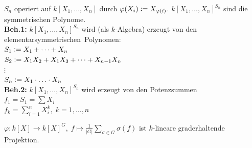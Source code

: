\documentclass[a4paper, 10pt]{report}
\begin{document}
\begin{nnBsp}
  $S_n$ operiert auf $k[X_1, \dots, X_n]$ durch $\varphi(X_i) \mathrel{\mathop:}=
  X_{\varphi(i)}$. $k[X_1, \dots, X_n]^{S_n}$ sind die symmetrischen Polynome.\\
  \textbf{Beh.1:} $k[X_1, \dots, X_n]^{S_n}$ wird (als $k$-Algebra) erzeugt von
  den \glqq elementarsymmetrischen\grqq\ Polynomen:\\ $S_1 \mathrel{\mathop:}= X_1 + \dots +
  X_n$\\ $S_2 \mathrel{\mathop:}= X_1X_2 + X_1X_3 + \dots + X_{n-1}X_n$\\
  $\vdots$\\
  $S_n \mathrel{\mathop:}= X_1 \cdot \ldots \cdot X_n$\\
  \textbf{Beh.2:} $k[X_1, \dots, X_n]^{S_n}$ wird erzeugt von den Potenzsummen\\
  $f_1 = S_1 = \sum X_i$\\
  $f_k = \sum_{i=1}^n X_i^k, \; k = 1, \dots, n$
\end{nnBsp}

\begin{nnBem}
  $\varphi: k[X] \to k[X]^G, \; f \mapsto \frac{1}{|G|}\sum_{\sigma \in G} 
  \sigma(f)$ ist $k$-lineare graderhaltende Projektion.
\end{nnBem}
\end{document}
